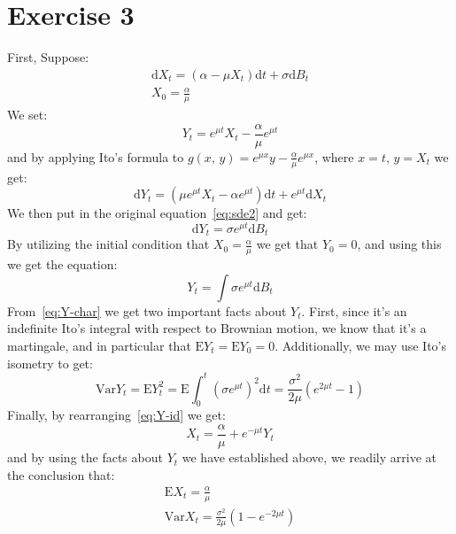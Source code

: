 \documentclass{article}
\theoremstyle{plain}
\theoremstyle{definition}
\theoremstyle{definition}
\theoremstyle{remark}
\newcommand{\diff}{\mathrm{d}}
\begin{document}
        \section{Exercise 3}
        First, Suppose:
        \begin{gather}
            \label{eq:sde2}
            \diff  X_{t} = \left(\alpha-\mu X_{t}\right)\diff t + \sigma \diff B_{t} \\
            X_{0} = \frac{\alpha}{\mu}
        \end{gather}
        We set:
        \begin{equation}
            \label{eq:Y-id}
            Y_{t} = e^{\mu t}X_{t} - \frac{\alpha}{\mu}e^{\mu t}
        \end{equation}
        and by applying Ito's formula to \(g \left(x,\,y\right) = e^{\mu x}y - \frac{\alpha}{\mu}e^{\mu x}\), where \(x=t,\,y=X_{t}\) we get:
        \begin{equation*}
            \diff Y_{t} = \left(\mu e^{\mu t}X_{t}-\alpha e^{\mu t}\right) \diff t + e^{\mu t}\diff X_{t}
        \end{equation*}
        We then put in the original equation~\eqref{eq:sde2} and get:
        \begin{equation*}
            \diff Y_{t} = \sigma e^{\mu t}\diff B_{t}
        \end{equation*}
        By utilizing the initial condition that \(X_{0} = \frac{\alpha}{\mu}\) we get that \(Y_{0} = 0\), and using this we get the equation:
        \begin{equation}
            \label{eq:Y-char}
            Y_{t} = \int \sigma e^{\mu t}\diff B_{t}
        \end{equation}
        From~\eqref{eq:Y-char} we get two important facts about \(Y_{t}\). First, since it's an indefinite Ito's integral with respect to Brownian motion, we know that it's a martingale, and in particular that \(\mathrm{E}Y_{t}=\mathrm{E}Y_{0}=0\). Additionally, we may use Ito's isometry to get:
        \begin{equation*}
            \mathrm{Var}Y_{t} = \mathrm{E}Y_{t}^{2} = \mathrm{E}\int_{0}^{t} \left(\sigma e^{\mu t}\right)^{2} \diff t = \frac{\sigma^{2}}{2 \mu} \left(e^{2 \mu t} - 1\right)
        \end{equation*}
       Finally, by rearranging~\eqref{eq:Y-id} we get:
       \begin{equation*}
           X_{t} = \frac{\alpha}{\mu} + e^{-\mu t}Y_{t}
       \end{equation*}
       and by using the facts about \(Y_{t}\) we have established above, we readily arrive at the conclusion that:
       \begin{gather*}
           \mathrm{E}X_{t} = \frac{\alpha}{\mu} \\
           \mathrm{Var} X_{t} = \frac{\sigma^{2}}{2 \mu} \left(1 - e^{-2 \mu t}\right)
       \end{gather*}
       
\end{document}

